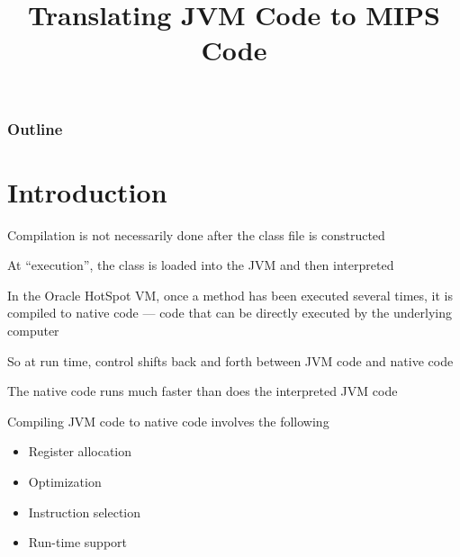 \documentclass[8pt,a4paper,compress]{beamer}
\title{Translating JVM Code to MIPS Code}
\date{}
\begin{document}
\begin{frame}
\vfill
\titlepage
\end{frame}

\begin{frame}
\frametitle{Outline}
\tableofcontents
\end{frame}

\section{Introduction}
\begin{frame}[fragile]
\pause

Compilation is not necessarily done after the class file is constructed

\pause
\bigskip

At ``execution'', the class is loaded into the JVM and then interpreted

\pause
\bigskip

In the Oracle HotSpot VM, once a method has been executed several times, it is compiled to native code --- code that can be directly executed by the underlying computer

\pause
\bigskip

So at run time, control shifts back and forth between JVM code and native code

\pause
\bigskip

The native code runs much faster than does the interpreted JVM code

\pause
\bigskip

Compiling JVM code to native code involves the following
\begin{itemize}
\item Register allocation
\item Optimization
\item Instruction selection
\item Run-time support
\end{itemize}
\end{frame}
\end{document}
